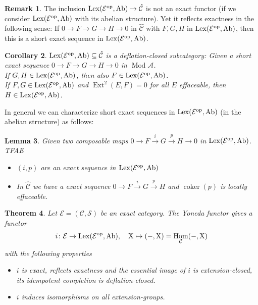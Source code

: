\documentclass[11pt,a4paper]{amsart}
\theoremstyle{plain}
\newtheorem{thm}{Theorem}[section]
\newtheorem{lem}[thm]{Lemma}
\newtheorem{cor}[thm]{Corollary}
\theoremstyle{definition}
\newtheorem{rem}[thm]{Remark}
\DeclareMathOperator{\Hom}{Hom}
\DeclareMathOperator{\Ext}{Ext}
\DeclareMathOperator{\Modu}{Mod}
\DeclareMathOperator{\coKer}{coker}
\newcommand{\mcA}{\mathcal{A}}
\newcommand{\mcC}{\mathcal{C}}
\newcommand{\mcD}{\mathcal{D}}
\newcommand{\mcE}{\mathcal{E}}
\newcommand{\mcS}{\mathcal{S}}
\begin{document}

\begin{rem}
The inclusion $\rm{Lex} (\mcE^{op}, Ab)\to \hat{\mcC}$ is not an exact functor (if we consider $\rm{Lex} (\mcE^{op}, Ab)$ with its abelian structure). Yet it reflects exactness in the following sense: If $0 \to F \to G \to H \to 0$ in $\hat{\mcC}$ with $F,G,H$ in $\rm{Lex} (\mcE^{op}, Ab)$, then this is a short exact sequence in $\rm{Lex} (\mcE^{op}, Ab)$.    
\end{rem}

\begin{cor}
$\rm{Lex} (\mcE^{op},Ab) \subseteq \hat{\mcC}$ is a deflation-closed subcategory: 
Given a short exact sequence $0 \to F \to G \to H \to 0$ in $\Modu \mcA$. \\
If $G,H\in \rm{Lex} (\mcE^{op}, Ab)$, then also $F \in \rm{Lex} (\mcE^{op}, Ab)$. \\
If $F,G \in \rm{Lex} (\mcE^{op}, Ab)$ and $\Ext^2(E,F)=0$ for all $E$ effaceable, then $H \in \rm{Lex} (\mcE^{op}, Ab)$.  
\end{cor}

In general we can characterize short exact sequences in $\rm{Lex}(\mcE^{op},Ab) $ (in the abelian structure) as follows:  
\begin{lem}
Given two composable maps $0 \to F \xrightarrow{i} G \xrightarrow{p} H \to 0$ in $\rm{Lex}(\mcE^{op},Ab) $. TFAE
\begin{itemize}
\item[(1)] $(i,p)$ are an exact sequence in $\rm{Lex}(\mcE^{op},Ab) $  
\item[(2)] In $\hat{\mcC}$ we have a exact sequence $0 \to F \xrightarrow{i} G \xrightarrow{p} H $ and $\coKer (p) $ is locally effaceable.  
\end{itemize}
\end{lem}



\begin{thm} Let $\mcE=(\mcC, \mcS)$ be an exact category. 
The Yoneda functor gives a functor 
\[
i\colon \mcE \to \rm{Lex} (\mcE^{op}, Ab), \quad X\mapsto  (-,X)=\Hom_{\mcC} (-,X)
\]
with the following properties
\begin{itemize}
\item[(1)] $i$ is exact, reflects exactness and the essential image of $i$ is extension-closed, its idempotent completion is deflation-closed.  
\item[(2)] $i$ induces isomorphisms on all extension-groups. \\
\end{itemize}
\end{thm}
\end{document}
